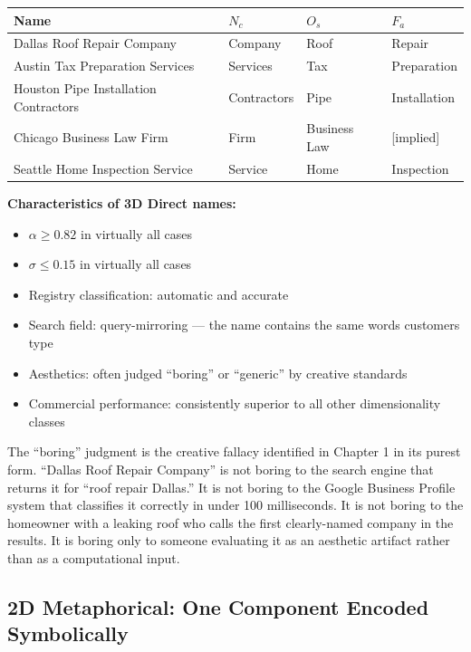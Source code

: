 \documentclass[12pt, openany]{book}
\theoremstyle{thmstyle}
\theoremstyle{defstyle}
\begin{document}
\begin{examplebox}
\begin{center}
\begin{tabular}{llll}
\toprule
\textbf{Name} & \textbf{$N_c$} & \textbf{$O_s$} & \textbf{$F_a$} \\
\midrule
Dallas Roof Repair Company & Company & Roof & Repair \\
Austin Tax Preparation Services & Services & Tax & Preparation \\
Houston Pipe Installation Contractors & Contractors & Pipe & Installation \\
Chicago Business Law Firm & Firm & Business Law & [implied] \\
Seattle Home Inspection Service & Service & Home & Inspection \\
\bottomrule
\end{tabular}
\end{center}

\vspace{6pt}
\textbf{Characteristics of 3D Direct names:}
\begin{itemize}[leftmargin=1.5em]
  \item $\alpha \geq 0.82$ in virtually all cases
  \item $\sigma \leq 0.15$ in virtually all cases
  \item Registry classification: automatic and accurate
  \item Search field: query-mirroring --- the name contains the same words customers type
  \item Aesthetics: often judged ``boring'' or ``generic'' by creative standards
  \item Commercial performance: consistently superior to all other dimensionality classes
\end{itemize}
\end{examplebox}

The ``boring'' judgment is the creative fallacy identified in Chapter 1 in its purest form. ``Dallas Roof Repair Company'' is not boring to the search engine that returns it for ``roof repair Dallas.'' It is not boring to the Google Business Profile system that classifies it correctly in under 100 milliseconds. It is not boring to the homeowner with a leaking roof who calls the first clearly-named company in the results. It is boring only to someone evaluating it as an aesthetic artifact rather than as a computational input.

\subsection{2D Metaphorical: One Component Encoded Symbolically}
\end{document}
